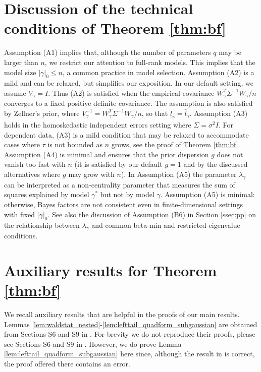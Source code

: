 \newpage
\section{Discussion of the technical conditions of Theorem \ref{thm:bf}}
\label{supplsec:conditions_thm_bf}


Assumption (A1) implies that, although the number of parameters $q$ may be larger than $n$, we restrict our attention to full-rank models. This implies that the model size $|\gamma|_0 \leq n$, a common practice in model selection.  Assumption (A2) is a mild and can be relaxed, but simplifies our exposition. In our default setting, we assume $V_\gamma=I$. Thus (A2) is satisfied when the empirical covariance $W_\gamma^T \Sigma^{-1} W_\gamma/n$ converges to a fixed positive definite covariance. The assumption is also satisfied by Zellner's prior, where $V_\gamma^{-1}= W_\gamma^T \Sigma^{-1} W_\gamma/n$, so that $\underline{l}_\gamma=\bar{l}_\gamma$. Assumption (A3) holds in the homoskedastic independent errors setting where $\Sigma=\sigma^2 I$. For dependent data, (A3) is a mild condition that may be relaxed to accommodate cases where $\tau$ is not bounded as $n$ grows, see the proof of Theorem \ref{thm:bf}.  Assumption (A4) is minimal and ensures that  the prior dispersion $g$ does not vanish too fast with $n$ (it is satisfied by our default $g=1$ and by the discussed alternatives where $g$ may grow with $n$). In Assumption (A5) the parameter $\lambda_\gamma$ can be interpreted as a non-centrality parameter that  measures the sum of squares explained by model $\gamma^*$ but not by model $\gamma$. Assumption (A5) is minimal: otherwise,  Bayes factors are not consistent even in finite-dimensional settings with fixed $|\gamma|_0$. See also the discussion of Assumption (B6) in Section \ref{ssec:pp} on the relationship between $\lambda_\gamma$ and common beta-min and restricted eigenvalue conditions.





\newpage
\section{Auxiliary results for Theorem \ref{thm:bf}}
\label{supplsec:auxiliary_results}

We recall auxiliary results that are helpful in the proofs of our main results.
Lemmas \ref{lem:waldstat_nested}-\ref{lem:lefttail_quadform_subgaussian} are obtained from Sections S6 and S9 in \cite{rossell:2021}.
For brevity we do not reproduce their proofs, please see Sections S6 and S9 in \cite{rossell:2021}.
However, we do prove Lemma \ref{lem:lefttail_quadform_subgaussian} here since, although the result in \cite{rossell:2021} is correct, the proof offered there contains an error.

